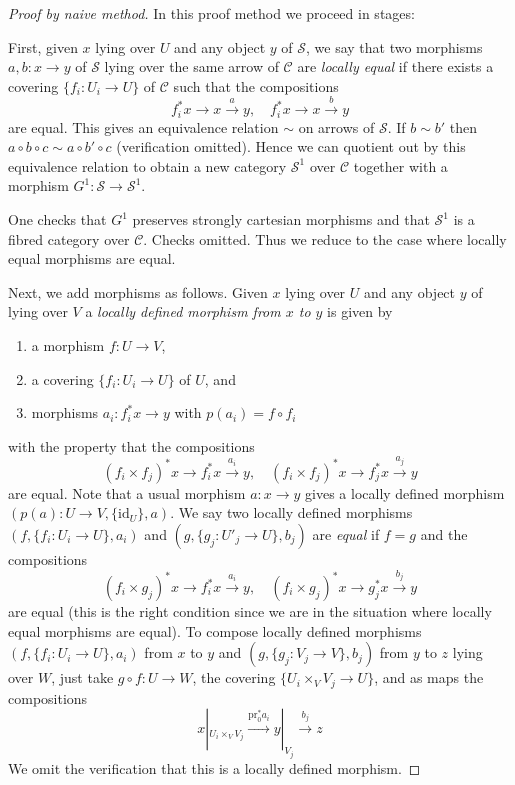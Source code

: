 \documentclass{stacks-project}
\theoremstyle{plain}
\theoremstyle{definition}
\theoremstyle{remark}
\numberwithin{equation}{subsection}
\begin{document}
\begin{proof}[Proof by naive method]
In this proof method we proceed in stages:

\medskip\noindent
First, given $x$ lying over $U$ and any object $y$ of
$\mathcal{S}$, we say that two morphisms
$a, b : x \to y$ of $\mathcal{S}$
lying over the same arrow of $\mathcal{C}$
are {\it locally equal}
if there exists a covering $\{f_i : U_i \to U\}$ of $\mathcal{C}$
such that the compositions
$$
f_i^*x \to x \xrightarrow{a} y,
\quad
f_i^*x \to x \xrightarrow{b} y
$$
are equal. This gives an equivalence relation $\sim$
on arrows of $\mathcal{S}$. If $b \sim b'$ then
$a \circ b \circ c \sim a \circ b' \circ c$ (verification omitted).
Hence we can quotient out by this equivalence relation to
obtain a new category $\mathcal{S}^1$ over $\mathcal{C}$
together with a morphism $G^1 : \mathcal{S} \to \mathcal{S}^1$.

\medskip\noindent
One checks that $G^1$ preserves strongly cartesian morphisms
and that $\mathcal{S}^1$ is a fibred category over $\mathcal{C}$.
Checks omitted. Thus we reduce to the case where locally equal
morphisms are equal.

\medskip\noindent
Next, we add morphisms as follows. Given
$x$ lying over $U$ and any object $y$ of lying over $V$
a {\it locally defined morphism from $x$ to $y$} is given by
\begin{enumerate}
\item a morphism $f : U \to V$,
\item a covering $\{f_i : U_i \to U\}$ of $U$, and
\item morphisms $a_i : f_i^*x \to y$ with $p(a_i) = f \circ f_i$
\end{enumerate}
with the property that the compositions
$$
(f_i \times f_j)^*x \to f_i^*x \xrightarrow{a_i} y,
\quad
(f_i \times f_j)^*x \to f_j^*x \xrightarrow{a_j} y
$$
are equal. Note that a usual morphism $a : x \to y$ gives a locally
defined morphism $(p(a) : U \to V, \{\text{id}_U\}, a)$.
We say two locally defined morphisms
$(f, \{f_i : U_i \to U\}, a_i)$ and $(g, \{g_j : U'_j \to U\}, b_j)$
are {\it equal} if $f = g$ and the compositions
$$
(f_i \times g_j)^*x \to f_i^*x \xrightarrow{a_i} y,
\quad
(f_i \times g_j)^*x \to g_j^*x \xrightarrow{b_j} y
$$
are equal (this is the right condition since we are in the
situation where locally equal morphisms are equal).
To compose locally defined morphisms
$(f, \{f_i : U_i \to U\}, a_i)$ from $x$ to $y$ and
$(g, \{g_j : V_j \to V\}, b_j)$ from $y$ to $z$ lying over $W$,
just take $g \circ f : U \to W$, the covering
$\{U_i \times_V V_j \to U\}$, and as maps the compositions
$$
x|_{U_i \times_V V_j}
\xrightarrow{\text{pr}_0^*a_i}
y|_{V_j}
\xrightarrow{b_j}
z
$$
We omit the verification that this is a locally defined morphism.


\end{proof}
\end{document}
